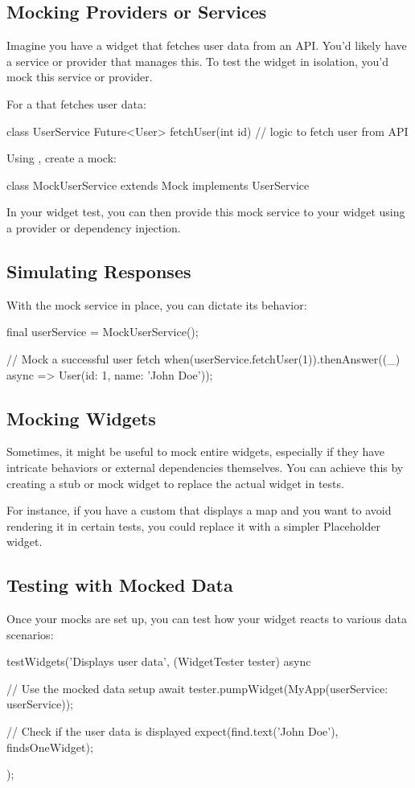 \subsection*{Mocking Providers or Services}
Imagine you have a widget that fetches user data from an API. 
You'd likely have a service or provider that manages this. 
To test the widget in isolation, you'd mock this service or provider.

For a  that fetches user data:

\begin{dartcode}
class UserService {
  Future<User> fetchUser(int id) {
    // logic to fetch user from API
  }
}
\end{dartcode}
Using , create a mock:
\begin{dartcode}
class MockUserService extends Mock implements UserService {}
\end{dartcode}

In your widget test, you can then provide this mock service to your widget using a provider or dependency injection.

\subsection*{Simulating Responses}
With the mock service in place, you can dictate its behavior:
\begin{dartcode}
final userService = MockUserService();

// Mock a successful user fetch
when(userService.fetchUser(1)).thenAnswer((_) async => User(id: 1, name: 'John Doe'));
\end{dartcode}

\subsection*{Mocking Widgets}
Sometimes, it might be useful to mock entire widgets, especially if they have intricate behaviors or external dependencies themselves. 
You can achieve this by creating a stub or mock widget to replace the actual widget in tests.

For instance, if you have a custom  that displays a map and you want to avoid rendering it in certain tests, you could replace it with a simpler Placeholder widget.

\subsection*{Testing with Mocked Data}
Once your mocks are set up, you can test how your widget reacts to various data scenarios:
\begin{dartcode}
testWidgets('Displays user data', (WidgetTester tester) async {
  // Use the mocked data setup
  await tester.pumpWidget(MyApp(userService: userService));

  // Check if the user data is displayed
  expect(find.text('John Doe'), findsOneWidget);
});
\end{dartcode}

